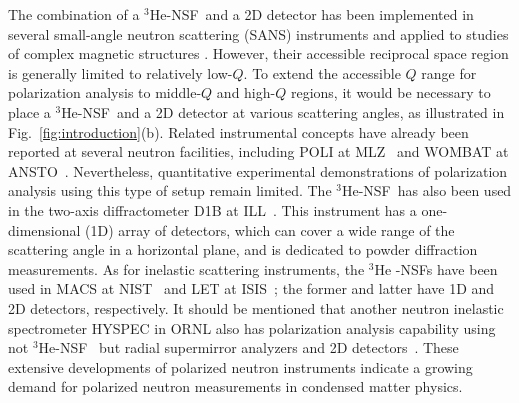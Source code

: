 \documentclass[%
 reprint,
superscriptaddress,
 amsmath,amssymb,
 aps,
floatfix,
]{revtex4-2}
\newcommand{\He}{$^3$He }
\newcommand{\Hensf}{$^3$He-NSF}
\begin{document}
The combination of a \Hensf~and a 2D detector has been implemented in several small-angle neutron scattering (SANS) instruments and applied to studies of complex magnetic structures \cite{singh_transition_2023,takagi_multiple-q_2018}.
However, their accessible reciprocal space region is generally limited to relatively low-$Q$.
To extend the accessible $Q$ range for polarization analysis to middle-$Q$ and high-$Q$ regions, it would be necessary to place a \Hensf~and a 2D detector at various scattering angles, as illustrated in Fig.~\ref{fig:introduction}(b).
Related instrumental concepts have already been reported at several neutron facilities, including POLI at MLZ~\cite{thoma_polarized_2018} and WOMBAT at ANSTO~\cite{lee_polarised_2016}.
Nevertheless, quantitative experimental demonstrations of polarization analysis using this type of setup remain limited.
The \Hensf~has also been used in the two-axis diffractometer D1B at ILL~\cite{heil_large_2002}. %
This instrument has a one-dimensional (1D) array of detectors, which can cover a wide range of the scattering angle in a horizontal plane, and is dedicated to powder diffraction measurements. %
As for inelastic scattering instruments, the \He-NSFs have been used in MACS at NIST~\cite{fu_wide_2011,ye_wide_2013,chen_recent_2016} and  LET at ISIS~\cite{nilsen_polarisation_2017,cassella_polarization_2019}; the former and latter have 1D and 2D detectors, respectively. %
It should be mentioned that another neutron inelastic spectrometer HYSPEC in ORNL also has polarization analysis capability using not \Hensf~ but radial supermirror analyzers and 2D detectors~\cite{zaliznyak_polarized_2017}.
These extensive developments of polarized neutron instruments indicate a growing demand for polarized neutron measurements in condensed matter physics. %
\end{document}

